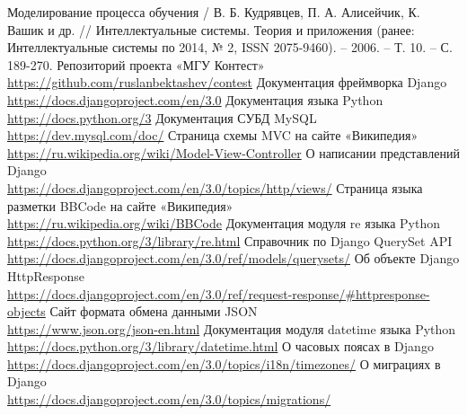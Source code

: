 \documentclass[12pt, a4paper, oneside]{article}
\begin{document}
\begin{thebibliography}{20}
    Моделирование процесса обучения / В. Б. Кудрявцев, П. А. Алисейчик, К. Вашик и др. // Интеллектуальные системы. Теория и приложения (ранее: Интеллектуальные системы по 2014, № 2, ISSN 2075-9460). – 2006. – Т. 10. – С. 189-270.
    Репозиторий проекта «МГУ Контест»\\
    \url{https://github.com/ruslanbektashev/contest}
    Документация фреймворка Django\\
    \url{https://docs.djangoproject.com/en/3.0}
    Документация языка Python\\
    \url{https://docs.python.org/3}
    Документация СУБД MySQL\\
    \url{https://dev.mysql.com/doc/}
    Страница схемы MVC на сайте «Википедия»\\
    \url{https://ru.wikipedia.org/wiki/Model-View-Controller}
    О написании представлений Django\\
    \url{https://docs.djangoproject.com/en/3.0/topics/http/views/}
    Страница языка разметки BBCode на сайте «Википедия»\\
    \url{https://ru.wikipedia.org/wiki/BBCode}
    Документация модуля re языка Python\\
    \url{https://docs.python.org/3/library/re.html}
    Справочник по Django QuerySet API\\
    \url{https://docs.djangoproject.com/en/3.0/ref/models/querysets/}
    Об объекте Django HttpResponse\\
    \url{https://docs.djangoproject.com/en/3.0/ref/request-response/#httpresponse-objects}
    Сайт формата обмена данными JSON\\
    \url{https://www.json.org/json-en.html}
    Документация модуля datetime языка Python\\
    \url{https://docs.python.org/3/library/datetime.html}
    О часовых поясах в Django\\
    \url{https://docs.djangoproject.com/en/3.0/topics/i18n/timezones/}
    О миграциях в Django\\
    \url{https://docs.djangoproject.com/en/3.0/topics/migrations/}
\end{thebibliography}
\endgroup
\end{document}
